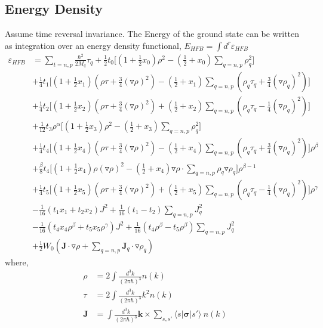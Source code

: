 \documentclass[preprint,prc,preprintnumbers,superscriptaddress,amsmath,amssymb,floatfix]{revtex4-1}
\begin{document}
 
\subsection{Energy Density}
Assume time reversal invariance. The Energy of the ground state can be written as integration over an energy density functional, $E_{HFB} = \int d^r  \varepsilon_{HFB} $
\begin{equation}
 \begin{split}
  \varepsilon_{HFB} &= \sum_{t=n,p}\frac{\hbar^2}{2M_q}\tau_q+\frac{1}{2}t_0\Big[(1+\frac{1}{2}x_0)\rho^2-(\frac{1}{2}+x_0)\sum_{q=n,p}\rho^2_q\Big]\\
  &+\frac{1}{4}t_1\Big[ (1+\frac{1}{2}x_1)(\rho \tau+\frac{3}{4}(\triangledown \rho)^2)-(\frac{1}{2}+x_1)\sum_{q=n,p}(\rho_q \tau_q+\frac{3}{4}(\triangledown \rho_q)^2)\Big]\\
  &+\frac{1}{4}t_2\Big[ (1+\frac{1}{2}x_2)(\rho \tau+\frac{3}{4}(\triangledown \rho)^2)+(\frac{1}{2}+x_2)\sum_{q=n,p}(\rho_q \tau_q-\frac{1}{4}(\triangledown \rho_q)^2)\Big]\\
  &+\frac{1}{12}t_3\rho^{\alpha}\Big[(1+\frac{1}{2}x_3)\rho^2-(\frac{1}{2}+x_3)\sum_{q=n,p}\rho_q^2\Big]\\
  &+\frac{1}{4}t_4\Big[ (1+\frac{1}{2}x_4)(\rho \tau+\frac{3}{4}(\triangledown \rho)^2)-(\frac{1}{2}+x_4)\sum_{q=n,p}(\rho_q \tau_q+\frac{3}{4}(\triangledown \rho_q)^2)\Big]\rho^{\beta}\\
 &+\frac{\beta}{8}t_4\Big[(1+\frac{1}{2}x_4)\rho(\triangledown \rho)^2-(\frac{1}{2}+x_4)\mathbf{\triangledown}\rho \cdot \sum_{q=n,p}\rho_q\mathbf{\triangledown}\rho_q\Big]\rho^{\beta-1}\\
 &+\frac{1}{4}t_5\Big[ (1+\frac{1}{2}x_5)(\rho \tau+\frac{3}{4}(\triangledown \rho)^2)+(\frac{1}{2}+x_5)\sum_{q=n,p}(\rho_q \tau_q-\frac{1}{4}(\triangledown \rho_q)^2)\Big]\rho^{\gamma}\\
 &-\frac{1}{16}(t_1x_1+t_2x_2)J^2+\frac{1}{16}(t_1-t_2)\sum_{q=n,p}J^2_q\\
 &-\frac{1}{16}(t_4 x_4\rho^{\beta}+t_5x_5\rho^{\gamma})J^2+\frac{1}{16}(t_4\rho^{\beta}-t_5\rho^{\beta})\sum_{q=n,p}J^2_q\\
 &+\frac{1}{2} W_0 (\mathbf{J}\cdot \mathbf{\triangledown}\rho+\sum_{q=n,p}\mathbf{J}_q\cdot \mathbf{\triangledown}\rho_q)
 \end{split}
\end{equation}
where,
\begin{equation}
 \begin{split}
  \rho &= 2\int \frac{d^3 k}{(2 \pi \hbar)^3} n(k)\\
  \tau &= 2\int \frac{d^3 k}{(2 \pi \hbar)^3} k^2 n(k)\\
  \mathbf{J}&= \int \frac{d^3k}{(2\pi \hbar)^3}\mathbf{k} \times \sum_{s,s'}\langle s|\pmb{\bm{\sigma}}|s'\rangle \ n(k)
 \end{split}
\end{equation}
\end{document}
